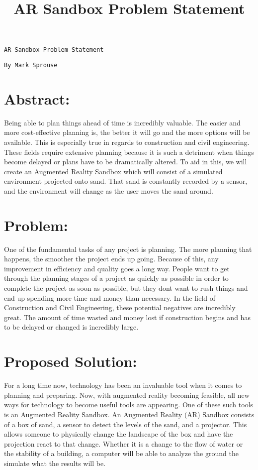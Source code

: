 \documentclass[10pt]{article}
\begin{document}
\title{AR Sandbox Problem Statement}
\begingroup
   \fontsize{20pt}{12pt}\selectfont
    \begin{verbatim}  
AR Sandbox Problem Statement  
    \end{verbatim}  
\endgroup
\begingroup
   \fontsize{15pt}{12pt}\selectfont
    \begin{verbatim}  
By Mark Sprouse  
    \end{verbatim}  
\endgroup
\vfill
\section{Abstract:}

Being able to plan things ahead of time is incredibly valuable.  The easier and more cost-effective planning is, the better it will go and the more options will be available.  This is especially true in regards to construction and civil engineering.  These fields require extensive planning because it is such a detriment when things become delayed or plans have to be dramatically altered.  To aid in this, we will create an Augmented Reality Sandbox which will consist of a simulated environment projected onto sand.  That sand is constantly recorded by a sensor, and the environment will change as the user moves the sand around.  

\newpage
\section{Problem:}

One of the fundamental tasks of any project is planning.  The more planning that happens, the smoother the project ends up going.  Because of this, any improvement in efficiency and quality goes a long way.  People want to get through the planning stages of a project as quickly as possible in order to complete the project as soon as possible, but they dont want to rush things and end up spending more time and money than necessary.  In the field of Construction and Civil Engineering, these potential negatives are incredibly great.   The amount of time wasted and money lost if construction begins and has to be delayed or changed is incredibly large.

\section{Proposed Solution:}

	For a long time now, technology has been an invaluable tool when it comes to planning and preparing.  Now, with augmented reality becoming feasible, all new ways for technology to become useful tools are appearing.  One of these such tools is an Augmented Reality Sandbox.  An Augmented Reality (AR) Sandbox consists of a box of sand, a sensor to detect the levels of the sand, and a projector.  This allows someone to physically change the landscape of the box and have the projection react to that change.  Whether it is a change to the flow of water or the stability of a building, a computer will be able to analyze the ground the simulate what the results will be.
\end{document}
